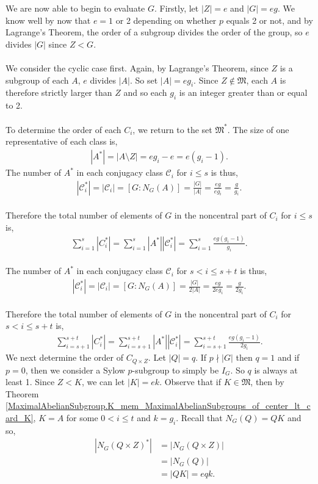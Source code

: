 We are now able to begin to evaluate $G$. Firstly, let $|Z| = e$ and $|G| = eg$. We know well by now that $e = 1$ or 2 depending on whether $p$ equals 2 or not, and by Lagrange's Theorem, the order of a subgroup divides the order of the group, so $e$ divides $|G|$ since $Z < G$. \\
\\
We consider the cyclic case first. Again, by Lagrange's Theorem, since $Z$ is a subgroup of each $A$, $e$ divides $|A|$. So set $|A| = eg_i$. Since $Z \notin \mathfrak{M}$, each $A$ is therefore strictly larger than $Z$ and so each $g_i$ is an integer greater than or equal to 2. \\
\\
To determine the order of each $C_i$, we return to the set $\mathfrak{M}^*$. The size of one representative of each class is,
\begin{align*} |A^*| = |A \! \setminus \! Z| = eg_i-e = e(g_i-1). \end{align*}
The number of $A^*$ in each conjugacy class $\mathcal{C}_i$ for $i \leq s$ is thus,
\begin{align*} |\mathcal{C}_i^*| = |\mathcal{C}_i| = [G:N_G(A)] = \frac{|G|}{|A|} = \frac{eg}{eg_i} = \frac{g}{g_i}. \end{align*}
\\
Therefore the total number of elements of $G$ in the noncentral part of $C_i$ for $i \leq s$ is,
\begin{align} \label{classeq1of3} \sum_{i=1}^{s} |C_i^*| = \sum_{i=1}^{s} |A^*| |\mathcal{C}_i^*| = \sum_{i=1}^{s} \frac{eg(g_i-1)}{g_i}.
\end{align}
\\
The number of $A^*$ in each conjugacy class $\mathcal{C}_i$ for $s < i \leq s+t$ is thus,
\begin{align*} |\mathcal{C}_i^*| = |\mathcal{C}_i| = [G:N_G(A)] = \frac{|G|}{2|A|} = \frac{eg}{2eg_i} = \frac{g}{2g_i}. \end{align*}
\\
Therefore the total number of elements of $G$ in the noncentral part of $C_i$ for $s < i \leq s+t$ is,
\begin{align}\label{classeq2of3} \sum_{i=s+1}^{s+t} |C_i^*| = \sum_{i=s+1}^{s+t} |A^*| |\mathcal{C}_i^*| = \sum_{i=s+1}^{s+t} \frac{eg(g_i-1)}{2g_i}.
\end{align}
We next determine the order of $C_{Q \times Z}$. Let $|Q| = q$. If $p \nmid |G|$ then $q=1$ and if $p = 0$, then we consider a Sylow $p$-subgroup to simply be $I_G$. So $q$ is always at least 1. Since $Z < K$, we can let $|K| = ek$. Observe that if $K \in \mathfrak{M}$, then by Theorem \ref{MaximalAbelianSubgroup.K_mem_MaximalAbelianSubgroups_of_center_lt_card_K}, $K = A$ for some $0 < i \leq t$ and $k = g_i$. Recall that $N_G(Q) = QK$ and so,
\begin{align*} |N_G(Q \times Z)^*| &= |N_G(Q \times Z)|  %
\\ &= |N_G(Q)| %
\\ &= |QK| = eqk.
\end{align*}

